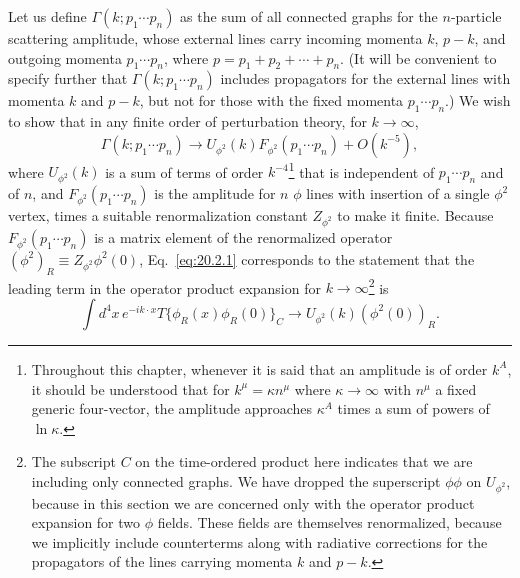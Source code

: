 Let us define $\Gamma(k;p_1\cdots p_n)$ as the sum of all connected graphs
for the $n$-particle scattering amplitude, whose external lines carry
incoming momenta $k$, $p-k$, and outgoing momenta $p_1\cdots p_n$, where
$p=p_1+p_2+\cdots+p_n$. (It will be convenient to specify further that
$\Gamma(k;p_1\cdots p_n)$ includes propagators for the external lines with
momenta $k$ and $p-k$, but not for those with the fixed momenta
$p_1\cdots p_n$.) We wish to show that in any finite order of perturbation
theory, for $k\to\infty$,
\begin{equation}
 \Gamma(k;p_1\cdots p_n)\longrightarrow
 U_{\phi^2}(k)F_{\phi^2}(p_1\cdots p_n)+O(k^{-5}),
 \tag{20.2.1}\label{eq:20.2.1}
\end{equation}
where $U_{\phi^2}(k)$ is a sum of terms of order
$k^{-4}$\footnote{Throughout this chapter, whenever it is said that an
amplitude is of order $k^A$, it should be understood that for
$k^\mu=\kappa n^\mu$ where $\kappa\to\infty$ with $n^\mu$ a fixed generic
four-vector, the amplitude approaches $\kappa^A$ times a sum of powers of
$\ln\kappa$.} that is independent of $p_1\cdots p_n$ and of $n$, and
$F_{\phi^2}(p_1\cdots p_n)$ is the amplitude for $n$ $\phi$ lines with
insertion of a single $\phi^2$ vertex, times a suitable renormalization
constant $Z_{\phi^2}$ to make it finite. Because
$F_{\phi^2}(p_1\cdots p_n)$ is a matrix element of the renormalized operator
$(\phi^2)_R\equiv Z_{\phi^2}\phi^2(0)$, Eq.~\eqref{eq:20.2.1} corresponds
to the statement that the leading term in the operator product expansion for
$k\to\infty$\footnote{The subscript $C$ on the time-ordered product here
indicates that we are including only connected graphs. We have dropped the
superscript $\phi\phi$ on $U_{\phi^2}$, because in this section we are
concerned only with the operator product expansion for two $\phi$ fields.
These fields are themselves renormalized, because we implicitly include
counterterms along with radiative corrections for the propagators of the
lines carrying momenta $k$ and $p-k$.} is
\begin{equation}
 \int d^4x\,e^{-ik\cdot x}
 T\{\phi_R(x)\phi_R(0)\}_C
 \longrightarrow U_{\phi^2}(k)(\phi^2(0))_R.
 \tag{20.2.2}\label{eq:20.2.2}
\end{equation}

